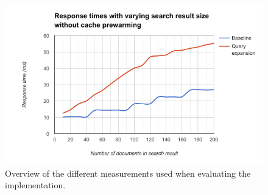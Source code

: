 \begin{figure}[h!]
  \centering \includegraphics[width=1\linewidth]{img/result-vary-result-size-without-cache.png}
  \caption{Overview of the different measurements used when evaluating the implementation.}
  \label{fig:result-vary-result-size}
\end{figure}
